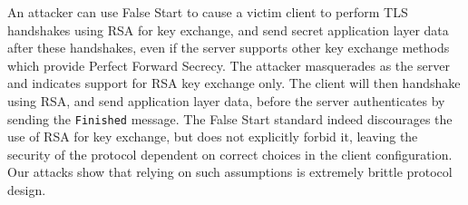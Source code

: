 \ifext
%
\fi

An attacker can use False Start to cause a victim client to perform TLS handshakes using RSA for key exchange\ifext, and send secret application layer data after these handshakes\fi, even if the server supports other key exchange methods which provide Perfect Forward Secrecy. The attacker masquerades as the server and indicates support for RSA key exchange only. The client will then handshake using RSA, and send application layer data, before the server authenticates by sending the \texttt{Finished} message. The False Start standard indeed discourages the use of RSA for key exchange, but does not explicitly forbid it, leaving the security of the protocol dependent on correct choices in the client configuration. Our attacks show that relying on such assumptions is extremely brittle protocol design.
\fi

